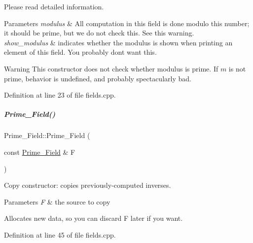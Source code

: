 Please read detailed information. 


\begin{DoxyParams}{Parameters}
{\em modulus} & All computation in this field is done modulo this number; it should be prime, but we do not check this. See this warning. \\
\hline
{\em show\+\_\+modulus} & indicates whether the modulus is shown when printing an element of this field. You probably don\textquotesingle{}t want this.\\
\hline
\end{DoxyParams}
\begin{DoxyWarning}{Warning}
This constructor does not check whether {\ttfamily modulus} is prime. If $m$ is not prime, behavior is undefined, and probably spectacularly bad. 
\end{DoxyWarning}


Definition at line 23 of file fields.\+cpp.

\mbox{\label{group___fields_group_a99ac17cca00c87af9ca859c8eae11006}} 
\subparagraph{\texorpdfstring{Prime\+\_\+\+Field()}{Prime\_Field()}\hspace{0.1cm}{\footnotesize\ttfamily [2/2]}}
{\footnotesize\ttfamily Prime\+\_\+\+Field\+::\+Prime\+\_\+\+Field (\begin{DoxyParamCaption}\item[{const \hyperlink{group___fields_group_class_prime___field}{Prime\+\_\+\+Field} \&}]{F }\end{DoxyParamCaption})\hspace{0.3cm}{\ttfamily [explicit]}}



Copy constructor\+: copies previously-\/computed inverses. 


\begin{DoxyParams}{Parameters}
{\em F} & the source to copy\\
\hline
\end{DoxyParams}
Allocates new data, so you can discard {\ttfamily F} later if you want. 

Definition at line 45 of file fields.\+cpp.



